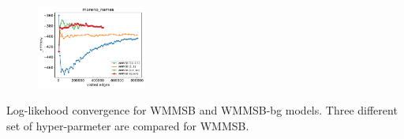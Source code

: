 \begin{subfigure}                                                           
         \centering                                                         
      \includegraphics[width=0.32\textwidth]{fig/moreno_names_fig__entropy}
\end{subfigure}                                                             
\caption{Log-likehood convergence for WMMSB and WMMSB-bg models. Three different set of hyper-parmeter are compared for WMMSB.}

